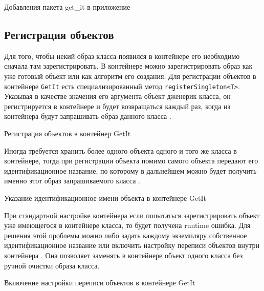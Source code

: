 \begin{image}
	\caption{Добавления пакета get\_it в приложение}
	\label{fig:getit:instance}
\end{image}

\subsection{Регистрация объектов}

Для того, чтобы некий образ класса появился в контейнере
его необходимо сначала там зарегистрировать.
В контейнере можно зарегистрировать образ как уже готовый объект
или как алгоритм его создания.
Для регистрации объектов в контейнере \texttt{GetIt}
есть специализированный метод \texttt{registerSingleton<T>}.
Указывая в качестве значения его аргумента объект дженерик класса,
он регистрируется в контейнере и будет возвращаться каждый раз,
когда из контейнера будут запрашивать
образ данного класса .

\begin{image}
	\caption{Регистрация объектов в контейнер GetIt}
	\label{fig:getit:registration}
\end{image}

Иногда требуется хранить более одного объекта одного
и того же класса в контейнере,
тогда при регистрации объекта помимо самого объекта передают
его идентификационное название,
по которому в дальнейшем можно будет получить именно
этот образ запрашиваемого класса .

\begin{image}
	\caption{Указание идентификационное имени объекта в контейнере GetIt}
	\label{fig:getit:registration:name}
\end{image}

При стандартной настройке контейнера если попытаться зарегистрировать
объект уже имеющегося в контейнере класса, то будет получена runtime ошибка.
Для решения этой проблемы можно либо задать
каждому экземпляру собственное идентификационное название
или включить настройку переписи объектов
внутри контейнера .
Она позволяет заменять в контейнере объект одного класса
без ручной очистки образа класса.

\begin{image}
	\caption{Включение настройки переписи объектов в контейнере GetIt}
	\label{fig:getit:registration:reassing}
\end{image}

